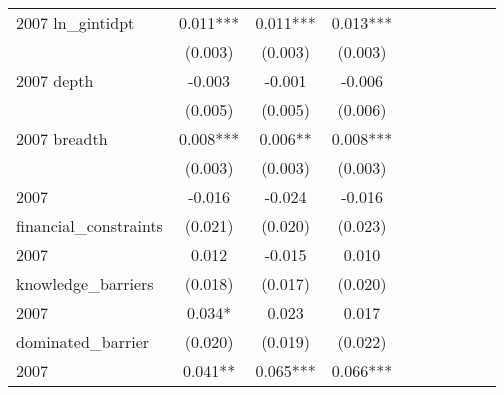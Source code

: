 \begin{table}[htbp]
\begin{tabular}{l*{9}{c}}
2007 ln\_gintidpt    &       0.011***&       0.011***&       0.013***&               &               &               &               &               &               \\
                    &     (0.003)   &     (0.003)   &     (0.003)   &               &               &               &               &               &               \\
2007 depth          &      -0.003   &      -0.001   &      -0.006   &               &               &               &               &               &               \\
                    &     (0.005)   &     (0.005)   &     (0.006)   &               &               &               &               &               &               \\
2007 breadth        &       0.008***&       0.006** &       0.008***&               &               &               &               &               &               \\
                    &     (0.003)   &     (0.003)   &     (0.003)   &               &               &               &               &               &               \\
2007                &      -0.016   &      -0.024   &      -0.016   &               &               &               &               &               &               \\
financial\_constraints&     (0.021)   &     (0.020)   &     (0.023)   &               &               &               &               &               &               \\
2007                &       0.012   &      -0.015   &       0.010   &               &               &               &               &               &               \\
knowledge\_barriers  &     (0.018)   &     (0.017)   &     (0.020)   &               &               &               &               &               &               \\
2007                &       0.034*  &       0.023   &       0.017   &               &               &               &               &               &               \\
dominated\_barrier   &     (0.020)   &     (0.019)   &     (0.022)   &               &               &               &               &               &               \\
2007                &       0.041** &       0.065***&       0.066***&               &               &               &               &               &               \\

\end{tabular}
\end{table}
